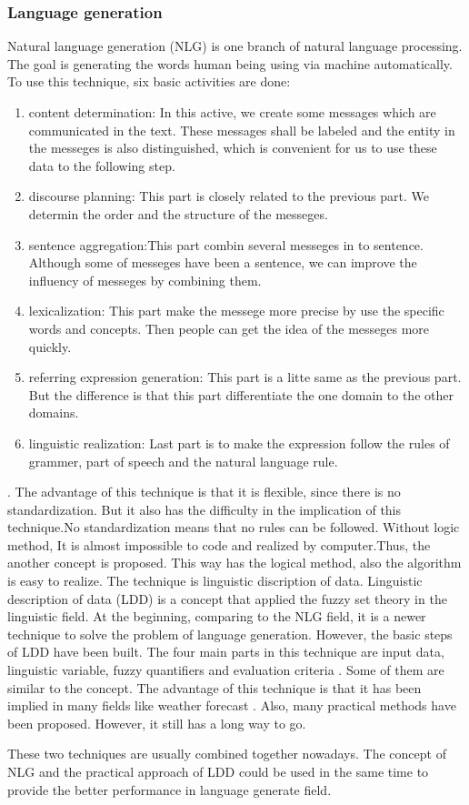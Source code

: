 \subsubsection*{Language generation}

Natural language generation (NLG) is one branch of natural language processing. The goal is generating the words human being using via machine automatically. To use this technique, six basic activities are done: 
\begin{enumerate}
	\item content determination: In this active, we create some messages which are communicated in the text. These messages shall be labeled and the entity in the messeges is also distinguished, which is convenient for us to use these data to the following step.
	\item discourse planning: This part is closely related to the previous part. We determin the order and the structure of the messeges.
	\item sentence aggregation:This part combin several messeges in to sentence. Although some of messeges have been a sentence, we can improve the influency of messeges by combining them.
	\item lexicalization: This part make the messege more precise by use the specific words and concepts. Then people can get the idea of the messeges more quickly.
	\item referring expression generation: This part is a litte same as the previous part. But the difference is that this part differentiate the one domain to the other domains.
	\item linguistic realization: Last part is to make the expression follow the rules of grammer, part of speech and the natural language rule.
\end{enumerate}
\cite{aramossoto2016onthe}. The advantage of this technique is that it is flexible, since there is no standardization. But it also has the difficulty in the implication of this technique.\cite{aramossoto2016onthe}No standardization means that no rules can be followed. Without logic method, It is almost impossible to code and realized by computer.Thus, the another concept is proposed. This way has the logical method, also the algorithm is easy to realize. The technique is linguistic discription of data.
Linguistic description of data (LDD) is a concept that applied the fuzzy set theory in the linguistic field. At the beginning, comparing to the NLG field, it is a newer technique to solve the problem of language generation. However, the basic steps of LDD have been built. The four main parts in this technique are input data, linguistic variable, fuzzy quantifiers and evaluation criteria \cite{aramossoto2016onthe}. Some of them are similar to the concept. The advantage of this technique is that it has been implied in many fields like weather forecast \cite{Ramos-SotoBBT14}. Also, many practical methods have been proposed. However, it still has a long way to go.

These two techniques are usually combined together nowadays. The concept of NLG and the practical approach of LDD could be used in the same time to provide the better performance in language generate field.

\newpage %